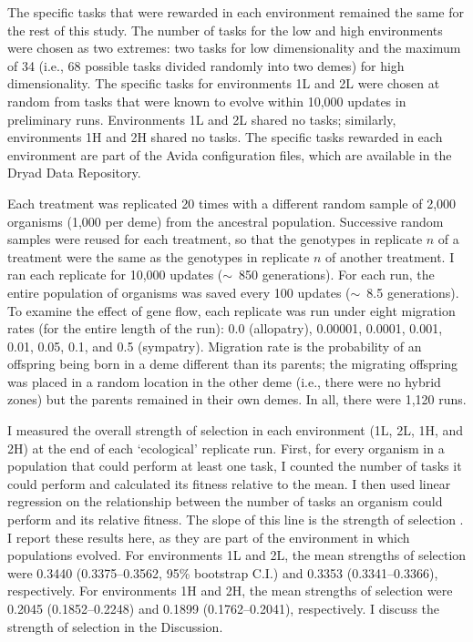 \begin{doublespace}
The specific tasks that were rewarded in each environment
remained the same for the rest of this study.
%
The number of tasks for the low and high environments
were chosen as two extremes: two tasks for low dimensionality
and the maximum of 34 (i.e., 68 possible tasks divided randomly
into two demes) for high dimensionality.
%
The specific tasks for environments 1L and 2L were chosen at random
from tasks that were known to evolve within 10,000 updates in preliminary runs.
%
Environments 1L and 2L shared no tasks;
similarly, environments 1H and 2H shared no tasks.
%
The specific tasks rewarded in each environment
are part of the Avida configuration files,
which are available in the Dryad Data Repository.



Each treatment was replicated 20 times
with a different random sample of 2,000 organisms (1,000 per deme)
from the ancestral population.
%
Successive random samples were reused for each treatment,
so that the genotypes in replicate $n$ of a treatment
were the same as the genotypes in replicate $n$ of another treatment.
%
I ran each replicate for 10,000 updates ($\sim$~850 generations).
%
For each run, the entire population of organisms
was saved every 100 updates ($\sim$~8.5 generations).
%
To examine the effect of gene flow,
each replicate was run under eight migration rates
(for the entire length of the run):
0.0 (allopatry), 0.00001, 0.0001, 0.001, 0.01, 0.05, 0.1, and 0.5 (sympatry).
%
Migration rate is the probability of an offspring
being born in a deme different than its parents;
the migrating offspring was placed in a random
location in the other deme (i.e., there were no hybrid zones)
but the parents remained in their own demes.
%
In all, there were 1,120 runs.



I measured the overall strength of selection in each environment
(1L, 2L, 1H, and 2H) at the end of each `ecological' replicate run.
%
First, for every organism in a population that could perform at least one task,
I counted the number of tasks it could perform
and calculated its fitness relative to the mean.
%
I then used linear regression on the relationship between
the number of tasks an organism could perform and its relative fitness.
%
The slope of this line is the strength of selection \citep{con04}.
%
I report these results here, as they are part of the environment
in which populations evolved.
%
For environments 1L and 2L, the mean strengths of selection were
0.3440 (0.3375--0.3562, 95\% bootstrap C.I.) and 0.3353 (0.3341--0.3366),
respectively.
%
For environments 1H and 2H, the mean strengths of selection were
0.2045 (0.1852--0.2248) and 0.1899 (0.1762--0.2041), respectively.
%
I discuss the strength of selection in the Discussion.




\end{doublespace}
